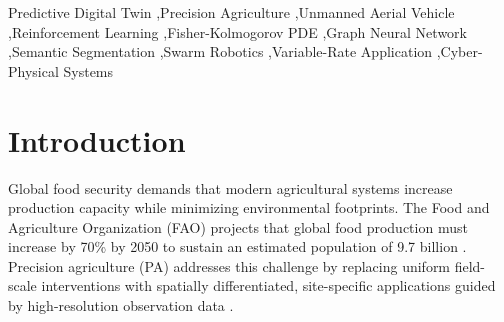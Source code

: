\documentclass[review,3p,times,authoryear]{elsarticle}
\begin{document}
\begin{frontmatter}
\begin{abstract}
The cyber-physical synchronization is closed through a 20~Hz WebSocket/MAVLink telemetry loop and a GPU-accelerated PyTorch kinematic particle engine simulating chemical droplet advection. Reconstructed 3D Digital Surface Models (DSM) and Canopy Height Models (CHM) are utilized to constrain spray altitudes. The framework was evaluated in a high-fidelity Software-in-the-Loop (SITL) environment across 30 randomized evaluation cycles representing tropical rice (\textit{Oryza sativa} L.) crop seasons. Under identical physical transition dynamics and multi-objective objectives, the proposed Q-learning scheduler achieved near-equivalent crop yield protection (within 6.2\% of the maximum, at \textbf{7.16 $\pm$ 0.16~t/ha}) while reducing agrochemical application cost to \textbf{\$233.33 $\pm$ 94.28/ha}---representing a \textbf{45.1\%} cost reduction compared to Genetic Algorithm (GA) solvers (\$424.78 $\pm$ 18.24/ha), a \textbf{45.3\%} reduction compared to Model Predictive Control (MPC) planners (\$426.53 $\pm$ 21.34/ha), and a \textbf{42.4\%} reduction compared to Deep Q-Network (DQN) baselines (\$404.75 $\pm$ 87.03/ha), excluding a lower-cost but weather-blind static heuristic. WebSocket communication latency maintained a mean of \textbf{0.78~ms}, and potential-field collision avoidance algorithms kept multi-drone proximity safety bounds above the critical 6-meter threshold. These findings indicate that the proposed PDT architecture provides a computationally efficient and risk-robust paradigm for closed-loop smart farming.
\end{abstract}

\begin{keyword}
Predictive Digital Twin \sep Precision Agriculture \sep Unmanned Aerial Vehicle \sep Reinforcement Learning \sep Fisher-Kolmogorov PDE \sep Graph Neural Network \sep Semantic Segmentation \sep Swarm Robotics \sep Variable-Rate Application \sep Cyber-Physical Systems
\end{keyword}

\end{frontmatter}

\section{Introduction}
Global food security demands that modern agricultural systems increase production capacity while minimizing environmental footprints. The Food and Agriculture Organization (FAO) projects that global food production must increase by 70\% by 2050 to sustain an estimated population of 9.7 billion \citep{fao2017}. Precision agriculture (PA) addresses this challenge by replacing uniform field-scale interventions with spatially differentiated, site-specific applications guided by high-resolution observation data \citep{zhang2002, gebbers2010}.
\end{document}

